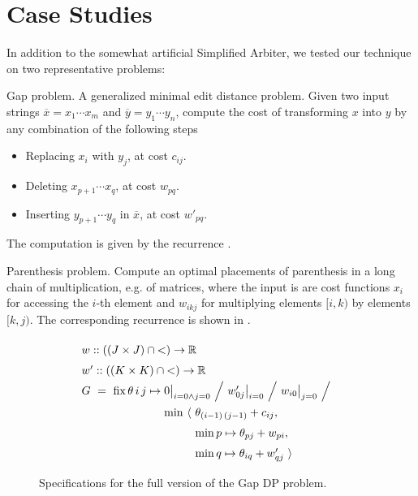 \section{Case Studies}

In addition to the somewhat artificial Simplified Arbiter,
we tested our technique on two representative problems:
\begin{paragraph}{Gap problem.}
A generalized minimal edit distance problem. Given two input strings 
$\overline{x}=x_1\cdots x_m$ and $\overline{y}=y_1\cdots y_n$,
compute the cost of transforming $x$ into $y$ by any combination of the
following steps
\begin{itemize}
  \item Replacing $x_i$ with $y_j$, at cost $c_{ij}$.
  \item Deleting $x_{p+1}\cdots x_q$, at cost $w_{pq}$.
  \item Inserting $y_{p+1}\cdots y_q$ in $\overline{x}$, at cost $w'_{pq}$.
\end{itemize}

The computation is given by the recurrence .
\end{paragraph}

\begin{paragraph}{Parenthesis problem.} Compute
an optimal placements of parenthesis in a long chain of multiplication, e.g. of matrices, where the input is
are cost functions $x_i$ for accessing the $i$-th element and
$w_{ikj}$ for multiplying elements $[i,k)$ by elements $[k,j)$.
The corresponding recurrence is shown in .
\end{paragraph}

\begin{figure}
\[
  \renewcommand\arraystretch{1.5}
  \begin{array}{@{}l@{}l@{}l@{}}
    \lspan3{w :: ((J\times J)\cap{<})\to\R} \\
    \lspan3{w' :: ((K\times K)\cap{<})\to\R} \\
    G ~=~ \fix \theta\,i\,j\mapsto{}
      & \lspan2{0\big|_{i=0\land j=0} ~\Big/~ w'_{0j}\big|_{i=0} ~\Big/~ w_{i0}\big|_{j=0} ~\Big/~} \\
      & \min~\langle~ & \theta_{(i-1)\,(j-1)} + c_{ij},\\
      & & \min p\mapsto\theta_{pj}+w_{pi}, \\
      & & \min q\mapsto\theta_{iq}+w'_{qj} ~\rangle
  \end{array}
\]
\caption{\label{evaluation:gap spec}
  Specifications for the full version of the Gap DP problem.}
\end{figure}

